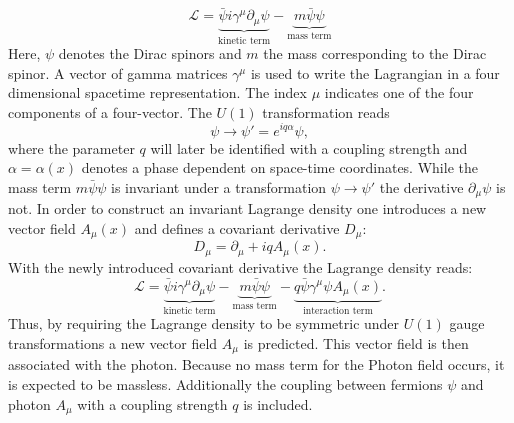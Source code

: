 	\begin{equation}
	\mathcal{L} = \underbrace{\bar{\psi} i \gamma^\mu \partial_\mu \psi}_{\text{kinetic term}} - \underbrace{m \bar{\psi} \psi}_{\text{mass term}}
	\label{eq:qedlag}
	\end{equation}
	Here, $\psi$ denotes the Dirac spinors and $m$ the mass corresponding to the Dirac spinor. A vector of gamma matrices $\gamma^\mu$ is used to write the Lagrangian in a four dimensional spacetime representation. The index $\mu$ indicates one of the four components of a four-vector. The $U(1)$ transformation reads
	\begin{equation}
	\psi \rightarrow \psi' = e^{i q \alpha} \psi,
	\label{eq:trafo}
	\end{equation}
	where the parameter $q$ will later be identified with a coupling strength and $\alpha = \alpha(x)$ denotes a phase dependent on space-time coordinates.  While the mass term $m \bar{\psi} \psi$ is invariant under a transformation $\psi \rightarrow \psi'$ the derivative $\partial_\mu \psi$ is not. In order to construct an invariant Lagrange density one introduces a new vector field $A_\mu(x)$ and defines a covariant derivative $D_\mu$:
	\begin{equation}
	D_\mu = \partial_\mu + i q A_\mu(x).
	\end{equation}
	With the newly introduced covariant derivative the Lagrange density reads:
	\begin{equation}
	\mathcal{L} = \underbrace{\bar{\psi} i \gamma^\mu \partial_\mu \psi}_{\text{kinetic term}} - \underbrace{m \bar{\psi} \psi}_{\text{mass term}} - \underbrace{q \bar{\psi} \gamma^\mu \psi A_\mu(x)}_{\text{interaction term}}.
	\end{equation}
	Thus, by requiring the Lagrange density to be symmetric under $U(1)$ gauge transformations a new vector field $A_\mu$ is predicted. This vector field is then associated with the photon. Because no mass term for the Photon field occurs, it is expected to be massless. Additionally the coupling between fermions $\psi$ and photon $A_\mu$ with a coupling strength $q$ is included. \cite{ModernParticlePhysics}
	
